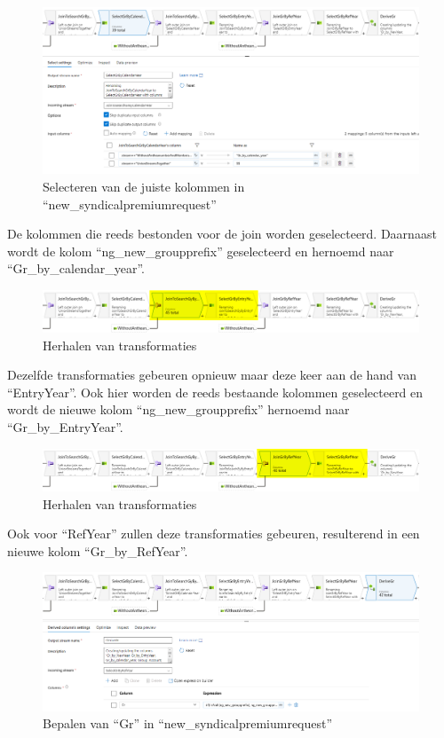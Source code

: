 \begin{figure}[H]
    \centering
    \includegraphics[width=1\textwidth]{./graphics/adf/gr_2.png}
    \caption{Selecteren van de juiste kolommen in ``new\_syndicalpremiumrequest''}
\end{figure}

De kolommen die reeds bestonden voor de join worden geselecteerd. Daarnaast wordt de kolom ``ng\_new\_groupprefix'' geselecteerd en hernoemd naar ``Gr\_by\_calendar\_year''.

\begin{figure}[H]
    \centering
    \includegraphics[width=1\textwidth]{./graphics/adf/gr_3.png}
    \caption{Herhalen van transformaties}
\end{figure}

Dezelfde transformaties gebeuren opnieuw maar deze keer aan de hand van ``EntryYear''. Ook hier worden de reeds bestaande kolommen geselecteerd en wordt de nieuwe kolom ``ng\_new\_groupprefix'' hernoemd naar ``Gr\_by\_EntryYear''.

\begin{figure}[H]
    \centering
    \includegraphics[width=1\textwidth]{./graphics/adf/gr_4.png}
    \caption{Herhalen van transformaties}
\end{figure}

Ook voor ``RefYear'' zullen deze transformaties gebeuren, resulterend in een nieuwe kolom ``Gr\_by\_RefYear''.

\begin{figure}[H]
    \centering
    \includegraphics[width=1\textwidth]{./graphics/adf/gr_5.png}
    \caption{Bepalen van ``Gr'' in ``new\_syndicalpremiumrequest''}
\end{figure}


